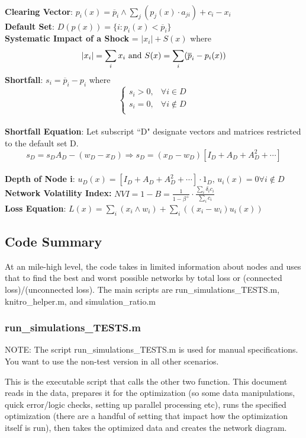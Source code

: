 \documentclass{article}
\newcommand{\?}{\stackrel{?}{=}}
\newcommand{\pbar}{\overline{p}}
\begin{document}
\\{\bf Clearing Vector}: $p_i(x)=\pbar_i\wedge\sum_j(p_j(x)\cdot a_{ji})+c_i-x_i$
\\{\bf Default Set}: $D(p(x))=\{i:p_i(x)<\pbar_i\}$
\\{\bf Systematic Impact of a Shock} = $|x_i| + S(x)$ where
$$|x_i|=\sum_ix_i\hbox{ and }S(x)=\sum_i(\pbar_i-p_i(x))$$
{\bf Shortfall}: $s_i=\pbar_i-p_i$ where 
	\[ \begin{cases}
                                  s_i>0, & \forall i \in D\\
                                   s_i=0, &  \forall i \not\in D\\
	\end{cases}
	 \]
\\ {\bf Shortfall Equation}: Let subscript ``D" designate vectors and matrices restricted to the default set D. $$s_D=s_DA_D - (w_D - x_D)\Rightarrow s_D=(x_D-w_D)[I_D+A_D+A^2_D+\cdots]$$
\\ {\bf Depth of Node i}: $u_D(x)=[I_D+A_D+A^2_D+\cdots]\cdot 1_D,\, u_i(x)=0\forall i\not\in D$
\\ {\bf Network Volatility Index:} $NVI=1-B=\frac{1}{1-\beta^+}\cdot \frac{\sum_i\delta_ic_i}{\sum_ic_i}$
\\ {\bf Loss Equation}: $L(x) = \sum_i(x_i\wedge w_i) + \sum_i( (x_i-w_i)u_i(x))$
\subsection{Code Summary}
At an mile-high level, the code takes in limited information about nodes and uses that to find the best and worst possible networks by total loss or (connected loss)/(unconnected loss). 
The main scripts are run\_simulations\_TESTS.m, knitro\_helper.m, and simulation\_ratio.m

\subsubsection{run\_simulations\_TESTS.m}

NOTE: The script run\_simulations\_TESTS.m is used for manual specifications. You want to use the non-test version in all other scenarios. 

This is the executable script that calls the other two function. This document reads in the data, prepares it for the optimization (so some data manipulations, quick error/logic checks, setting up parallel processing etc), runs the specified optimization (there are a handful of setting that impact how the optimization itself is run), then takes the optimized data and creates the network diagram. 
\end{document}

